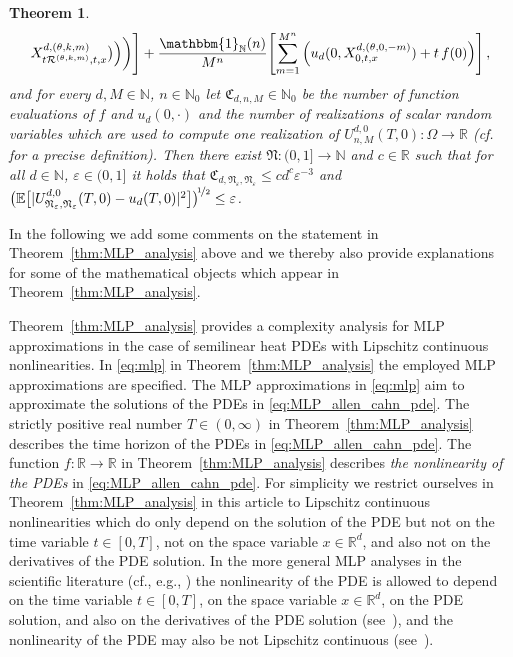 \documentclass[12pt,AutoFakeBold,AutoFakeSlant]{article}
\newtheorem{theorem}{Theorem}
\theoremstyle{definition}
\newcommand{\R}{\mathbb{R}}
\newcommand{\E}{\mathbb{E}}
\newcommand{\N}{\mathbb{N}}
\begin{document}
\begin{theorem}
\begin{align}
	X^{d,(\theta,k,m)}_{ t \mathcal{R}^{(\theta,k,m)},t,x}\big)
	\Big)
	\bigg)
	\Bigg]
	+ 
	\frac{ \mathbbm{1}_{ \N }( n ) }{M^n}\!\left[ 
	\sum_{m=1}^{M^n} 
	\left( 
	u_d(0,X^{d,(\theta,0,-m)}_{0,t,x}) 
	+ 
	t \, f(0)
	\right)
	\right], 
	\nonumber
	\end{align} 
	and for every 
	$ d, M \in \N $, 
	$ n \in \N_0 $
	let 
	$ \mathfrak{C}_{ d, n, M } \in \N_0 $
	be the number of function evaluations of $ f $ and $ u_d(0,\cdot) $ and 
	the number of realizations of scalar random variables 
	which are used to compute one realization of 
	$ U^{d,0}_{n,M}(T,0) \colon \Omega \to \R $ 
	(cf.~\cite[Corollary 4.4]{hutzenthaler2020lipschitz} for a precise definition). 
	Then there exist
	$ \mathfrak{N} \colon (0,1] \to \N $ 
	and 
	$ c \in \R $ 
	such that for all 
	$ d \in \N $, $ \varepsilon \in (0,1] $ 
	it holds that 
	$
	\mathfrak{C}_{d,\mathfrak{N}_{\varepsilon},\mathfrak{N}_{\varepsilon}} 
	\leq c d^c \varepsilon^{ - 3 }
	$
	and 
	$ 
	\big(  
		\E\big[ 
		|
			U^{d,0}_{\mathfrak{N}_{\varepsilon},\mathfrak{N}_{\varepsilon}}(T,0)
			- 
			u_d(T,0)
		|^2
		\big]
	\big)^{\!\nicefrac12} 
	\leq \varepsilon
	$. 
	\end{theorem} 
	In the following we add some comments on the statement in Theorem~\ref{thm:MLP_analysis} above 
	and we thereby also provide explanations for some of the mathematical objects which appear in Theorem~\ref{thm:MLP_analysis}. 


	Theorem~\ref{thm:MLP_analysis} provides a complexity analysis for MLP approximations 
	in the case of semilinear heat PDEs with Lipschitz continuous nonlinearities. 
	In \eqref{eq:mlp} in Theorem~\ref{thm:MLP_analysis} the employed MLP approximations are specified. 
	The MLP approximations in \eqref{eq:mlp} aim to approximate the solutions of the PDEs in \eqref{eq:MLP_allen_cahn_pde}. 
	The strictly positive real number $ T \in (0,\infty) $ in Theorem~\ref{thm:MLP_analysis} describes the time horizon of the PDEs in \eqref{eq:MLP_allen_cahn_pde}. The function $ f \colon \R \to \R $ in Theorem~\ref{thm:MLP_analysis} describes \emph{the nonlinearity of the PDEs} in \eqref{eq:MLP_allen_cahn_pde}. For simplicity we restrict ourselves in 
	Theorem~\ref{thm:MLP_analysis} in this article to Lipschitz continuous 
	nonlinearities which do only depend on the solution of the PDE but not 
	on the time variable $ t \in [0,T] $, not on the space variable $ x \in \R^d $, and also not on the derivatives 
	of the PDE solution. In the more general MLP analyses in the scientific literature 
	(cf., 
	e.g., \cite{
	Hutzenthaleretal2018arXiv,
	hutzenthaler2019arxiv1903,
	Becketal2019MLP_nonlip_arXiv,
	giles2019generalised,
	beck2020arxiv2003,
	becker2020arxiv2005,
	hutzenthaler2019arxiv1912,
	hutzenthaler2020lipschitz}) the nonlinearity of the PDE is allowed to depend on the time variable $ t \in [0,T] $, 
	on the space variable $ x \in \R^d $, 
	on the PDE solution, 
	and also on the derivatives of the PDE solution (see~\cite{hutzenthaler2019arxiv1912}), 
	and the nonlinearity of the PDE may also be not Lipschitz continuous (see~\cite{Becketal2019MLP_nonlip_arXiv,becker2020arxiv2005}). 
\end{document}
